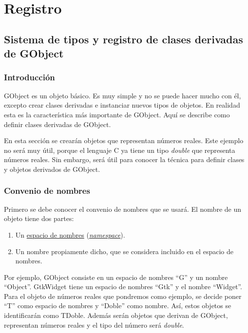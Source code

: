%

\section{Registro}
\subsection{Sistema de tipos y registro de clases derivadas de \textsf{GObject}} \label{subsec:sistematipos_y_registro}
\subsubsection{Introducción}
\textsf{GObject} es un objeto básico. Es muy simple y no se puede hacer mucho con él, excepto crear
clases derivadas e instanciar nuevos tipos de objetos.
En realidad esta es la característica más importante de \textsf{GObject}.
Aquí se describe como definir clases derivadas de \textsf{GObject}.

En esta sección se crearán objetos que representan números reales. Este ejemplo no será muy útil, porque
el lenguaje C ya tiene un tipo \emph{double} que representa números reales. Sin embargo, será útil para
conocer la técnica para definir clases y objetos derivados de \textsf{GObject}.

\subsubsection{Convenio de nombres}
Primero se debe conocer el convenio de nombres que se usará. El nombre de un objeto tiene dos partes:
\begin{enumerate}
  \tightlist
\item Un \href{https://es.wikipedia.org/wiki/Espacio_de_nombres}{espacio de nombres}
  (\href{https://en.wikipedia.org/wiki/Namespace}{\textit{namespace}}).
\item Un nombre propiamente dicho, que se considera incluido en el espacio de nombres.
\end{enumerate}

Por ejemplo, \textsf{GObject} consiste en un espacio de nombres ``\textsf{G}'' y un nombre ``\textsf{Object}''.
\textsf{GtkWidget} tiene un espacio de nombres ``\textsf{Gtk}'' y el nombre ``\textsf{Widget}''.
Para el objeto de números reales que pondremos como ejemplo, se decide poner ``\textsf{T}'' como espacio
de nombres y ``\textsf{Doble}'' como nombre. Así, estos objetos se identificarán como \textsf{TDoble}.
Además serán objetos que derivan de \textsf{GObject}, representan números reales y el tipo del número
será \textit{double}.

